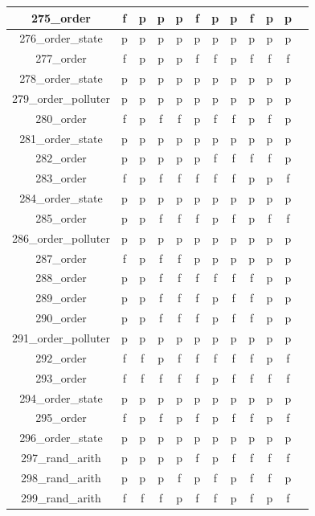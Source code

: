 \documentclass[
fancyheadings, %
%
%
]{stsreprt}
\begin{document}
\begin{longtable}{|c|c|c|c|c|c|c|c|c|c|c|c|}
\hline
275\_order & f & p & p & p & f & p & p & f & p & p \\
\hline
276\_order\_state & p & p & p & p & p & p & p & p & p & p \\
\hline
277\_order & f & p & p & p & f & f & p & f & f & f \\
\hline
278\_order\_state & p & p & p & p & p & p & p & p & p & p \\
\hline
279\_order\_polluter & p & p & p & p & p & p & p & p & p & p \\
\hline
280\_order & f & p & f & f & p & f & f & p & f & p \\
\hline
281\_order\_state & p & p & p & p & p & p & p & p & p & p \\
\hline
282\_order & p & p & p & p & p & f & f & f & f & p \\
\hline
283\_order & f & p & f & f & f & f & f & p & p & f \\
\hline
284\_order\_state & p & p & p & p & p & p & p & p & p & p \\
\hline
285\_order & p & p & f & f & f & p & f & p & f & f \\
\hline
286\_order\_polluter & p & p & p & p & p & p & p & p & p & p \\
\hline
287\_order & f & p & f & f & p & p & p & p & p & p \\
\hline
288\_order & p & p & f & f & f & f & f & f & p & p \\
\hline
289\_order & p & p & f & f & f & p & f & f & p & p \\
\hline
290\_order & p & p & f & f & f & p & f & f & p & p \\
\hline
291\_order\_polluter & p & p & p & p & p & p & p & p & p & p \\
\hline
292\_order & f & f & p & f & f & f & f & f & p & f \\
\hline
293\_order & f & f & f & f & f & p & f & f & f & f \\
\hline
294\_order\_state & p & p & p & p & p & p & p & p & p & p \\
\hline
295\_order & f & p & f & p & f & p & f & f & p & f \\
\hline
296\_order\_state & p & p & p & p & p & p & p & p & p & p \\
\hline
297\_rand\_arith & p & p & p & p & f & p & f & f & f & f \\
\hline
298\_rand\_arith & p & p & p & f & p & f & p & f & f & p \\
\hline
299\_rand\_arith & f & f & f & p & f & f & p & f & p & f \\

\end{longtable}
\end{document}
